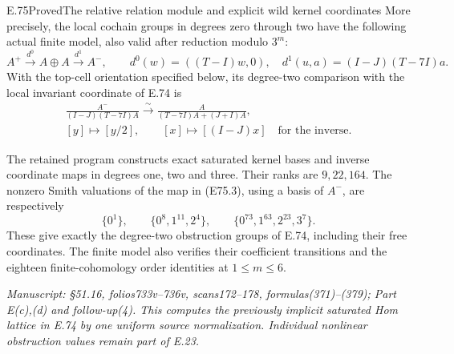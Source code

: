 \begin{statement}{E.75}{Proved}{The relative relation module and explicit wild kernel coordinates}
More precisely, the local cochain groups in degrees
zero through two have the following actual finite
model, also valid after reduction modulo $3^m$:
\[
 A^+\xrightarrow{d^0}A\oplus A
       \xrightarrow{d^1}A^-,\qquad
 d^0(w)=((T-I)w,0),\quad
 d^1(u,a)=(I-J)(T-7I)a.
 \tag{E75.6}
\]
With the top-cell orientation specified below, its
degree-two comparison with the local invariant
coordinate of E.74 is
\[
 \begin{gathered}
 \frac{A^-}{(I-J)(T-7I)A}\xrightarrow{\sim}
 \frac{A}{(T-7I)A+(J+I)A},\\
 [y]\longmapsto[y/2],\qquad
 [x]\longmapsto[(I-J)x]\quad\text{for the inverse}.
 \end{gathered}
 \tag{E75.7}
\]

The retained program constructs exact saturated
kernel bases and inverse coordinate maps in degrees
one, two and three. Their ranks are $9,22,164$.
The nonzero Smith valuations of the map in (E75.3),
using a basis of $A^-$, are respectively
\[
 \{0^1\},\qquad
 \{0^8,1^{11},2^4\},\qquad
 \{0^{73},1^{63},2^{23},3^7\}.
 \tag{E75.8}
\]
These give exactly the degree-two obstruction groups
of E.74, including their free coordinates. The
finite model also verifies their coefficient
transitions and the eighteen finite-cohomology
order identities at $1\le m\le6$.

\emph{Manuscript: \S51.16, folios733v--736v,
scans172--178, formulas(371)--(379); Part E(c),(d)
and follow-up(4). This computes the previously
implicit saturated Hom lattice in E.74 by one
uniform source normalization. Individual nonlinear
obstruction values remain part of E.23.}
\end{statement}

